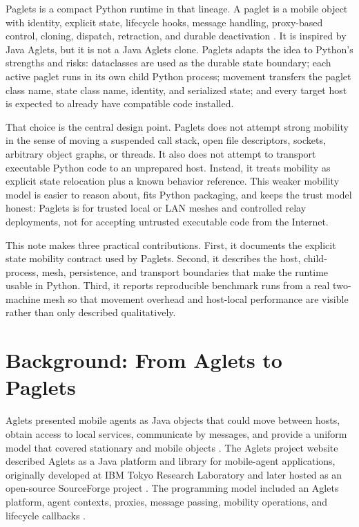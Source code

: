 \documentclass[11pt,a4paper]{article}
\begin{document}
Paglets is a compact Python runtime in that lineage. A paglet is a mobile
object with identity, explicit state, lifecycle hooks, message handling,
proxy-based control, cloning, dispatch, retraction, and durable deactivation
\cite{pagletsSoftware,pagletsDocs}. It is inspired by Java Aglets, but it is not
a Java Aglets clone. Paglets adapts the idea to Python's strengths and risks:
dataclasses are used as the durable state boundary; each active paglet runs in
its own child Python process; movement transfers the paglet class name, state
class name, identity, and serialized state; and every target host is expected to
already have compatible code installed.

That choice is the central design point. Paglets does not attempt strong
mobility in the sense of moving a suspended call stack, open file descriptors,
sockets, arbitrary object graphs, or threads. It also does not attempt to
transport executable Python code to an unprepared host. Instead, it treats
mobility as explicit state relocation plus a known behavior reference. This
weaker mobility model is easier to reason about, fits Python packaging, and
keeps the trust model honest: Paglets is for trusted local or LAN meshes and
controlled relay deployments, not for accepting untrusted executable code from
the Internet.

This note makes three practical contributions. First, it documents the explicit
state mobility contract used by Paglets. Second, it describes the host,
child-process, mesh, persistence, and transport boundaries that make the runtime
usable in Python. Third, it reports reproducible benchmark runs from a real
two-machine mesh so that movement overhead and host-local performance are
visible rather than only described qualitatively.

\section{Background: From Aglets to Paglets}

Aglets presented mobile agents as Java objects that could move between hosts,
obtain access to local services, communicate by messages, and provide a uniform
model that covered stationary and mobile objects \cite{lange1997aglets}. The
Aglets project website described Aglets as a Java platform and library for
mobile-agent applications, originally developed at IBM Tokyo Research Laboratory
and later hosted as an open-source SourceForge project
\cite{agletsSourceForge}. The programming model included an Aglets platform,
agent contexts, proxies, message passing, mobility operations, and lifecycle
callbacks \cite{langeOshimaAgletApi}.
\end{document}
